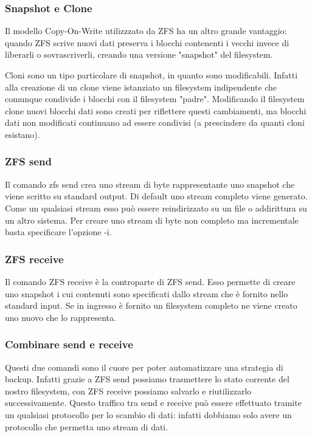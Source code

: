 \documentclass{beamer}
\begin{document}
\begin{frame}
\frametitle{Snapshot e Clone}
Il modello Copy-On-Write utilizzzato da ZFS ha un altro grande vantaggio: quando ZFS scrive nuovi dati preserva i blocchi contenenti i vecchi invece di liberarli o sovrascriverli, creando una versione "snapshot" del filesystem.
\end{frame}

\begin{frame}
Cloni sono un tipo particolare di snapshot, in quanto sono modificabili. Infatti alla creazione di un clone viene istanziato un filesystem indipendente che comunque condivide i blocchi con il filesystem "padre". Modificando il filesystem clone nuovi blocchi dati sono creati per riflettere questi cambiamenti, ma blocchi dati non modificati continuano ad essere condivisi (a prescindere da quanti cloni esistano).
\end{frame}

\begin{frame}
\frametitle{ZFS send}
Il comando zfs send crea uno stream di byte rappresentante uno snapshot che viene scritto su standard output. Di default uno stream completo viene generato. Come un qualsiasi stream esso pu\`o essere reindirizzato su un file o addirittura su un altro sistema.
\newline
Per creare uno stream di byte non completo ma incrementale basta specificare l'opzione -i.
\end{frame}

\begin{frame}
\frametitle{ZFS receive}
Il comando ZFS receive \`e la controparte di ZFS send. Esso permette di creare uno snapshot i cui contenuti sono specificati dallo stream che \`e fornito nello standard input. Se in ingresso \`e fornito un filesystem completo ne viene creato uno nuovo che lo rappresenta.
\end{frame}

\begin{frame}
\frametitle{Combinare send e receive}
Questi due comandi sono il cuore per poter automatizzare una strategia di backup. Infatti grazie a ZFS send possiamo trasmettere lo stato corrente del nostro filesystem, con ZFS receive possiamo salvarlo e riutilizzarlo successivamente.
\newline
Questo traffico tra send e receive pu\`o essere effettuato tramite un qualsiasi protocollo per lo scambio di dati: infatti dobbiamo solo avere un protocollo che permetta uno stream di dati.
\end{frame}
\end{document}

